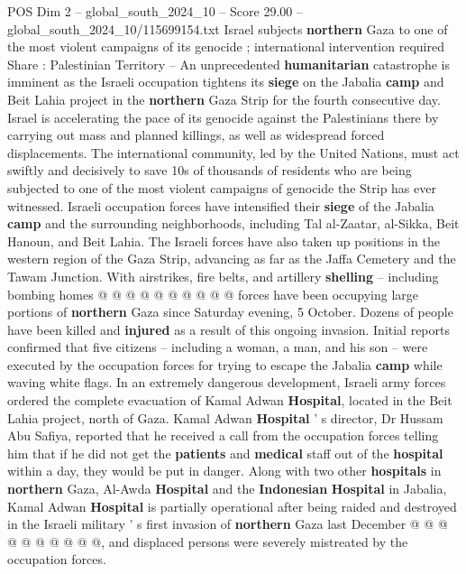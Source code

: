 \begin{textsample}{POS Dim 2 – global\_south\_2024\_10 – Score 29.00 – global\_south\_2024\_10/115699154.txt}  \label{ex:f2_pos_134}
Israel subjects \textbf{northern} Gaza to one of the most violent campaigns of its genocide ; international intervention required Share : Palestinian Territory -- An unprecedented \textbf{humanitarian} catastrophe is imminent as the Israeli occupation tightens its \textbf{siege} on the Jabalia \textbf{camp} and Beit Lahia project in the \textbf{northern} Gaza Strip for the fourth consecutive day.
Israel is accelerating the pace of its genocide against the Palestinians there by carrying out mass and planned killings, as well as widespread forced displacements.
The international community, led by the United Nations, must act swiftly and decisively to save 10s of thousands of residents who are being subjected to one of the most violent campaigns of genocide the Strip has ever witnessed.
Israeli occupation forces have intensified their \textbf{siege} of the Jabalia \textbf{camp} and the surrounding neighborhoods, including Tal al-Zaatar, al-Sikka, Beit Hanoun, and Beit Lahia.
The Israeli forces have also taken up positions in the western region of the Gaza Strip, advancing as far as the Jaffa Cemetery and the Tawam Junction.
With airstrikes, fire belts, and artillery \textbf{shelling} -- including bombing homes @ @ @ @ @ @ @ @ @ @ forces have been occupying large portions of \textbf{northern} Gaza since Saturday evening, 5 October.
Dozens of people have been killed and \textbf{injured} as a result of this ongoing invasion.
Initial reports confirmed that five citizens -- including a woman, a man, and his son -- were executed by the occupation forces for trying to escape the Jabalia \textbf{camp} while waving white flags.
In an extremely dangerous development, Israeli army forces ordered the complete evacuation of Kamal Adwan \textbf{Hospital}, located in the Beit Lahia project, north of Gaza.
Kamal Adwan \textbf{Hospital} ' s director, Dr Hussam Abu Safiya, reported that he received a call from the occupation forces telling him that if he did not get the \textbf{patients} and \textbf{medical} staff out of the \textbf{hospital} within a day, they would be put in danger.
Along with two other \textbf{hospitals} in \textbf{northern} Gaza, Al-Awda \textbf{Hospital} and the \textbf{Indonesian} \textbf{Hospital} in Jabalia, Kamal Adwan \textbf{Hospital} is partially operational after being raided and destroyed in the Israeli military ' s first invasion of \textbf{northern} Gaza last December @ @ @ @ @ @ @ @ @ @, and displaced persons were severely mistreated by the occupation forces.

\end{textsample}
